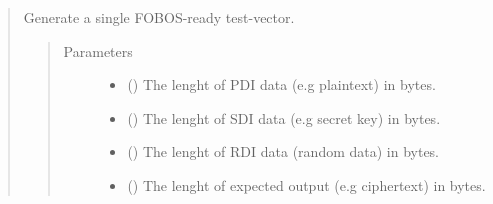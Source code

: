 \documentclass[letterpaper,10pt,english]{sphinxmanual}
\begin{document}
\begin{fulllineitems}
\begin{quote}
\begin{fulllineitems}
\begin{quote}
\begin{description}
\begin{itemize}
\end{itemize}

\end{description}\end{quote}

\end{fulllineitems}


\begin{fulllineitems}
\label{\detokenize{reference_doc:DataGenerator.randTestVector}}
Generate a single FOBOS-ready test-vector.
\begin{quote}\begin{description}
\item[{Parameters}] \leavevmode\begin{itemize}
\item {} 
 () \textendash{} The lenght of PDI data (e.g plaintext) in bytes.

\item {} 
 () \textendash{} The lenght of SDI data (e.g secret key) in bytes.

\item {} 
 () \textendash{} The lenght of RDI data (random data) in bytes.

\item {} 
 () \textendash{} The lenght of expected output (e.g ciphertext) in bytes.

\end{itemize}

\end{description}\end{quote}

\end{fulllineitems}

\end{quote}

\end{fulllineitems}
\end{document}
